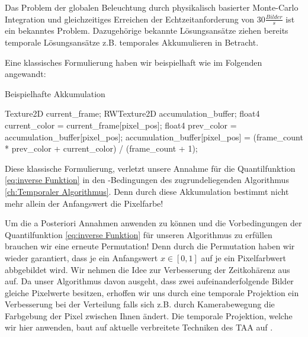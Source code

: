 Das Problem der globalen Beleuchtung durch physikalisch basierter Monte-Carlo Integration und gleichzeitiges Erreichen der 
Echtzeitanforderung von 30$\frac{Bilder}{s}$ ist ein bekanntes Problem. Dazugehörige bekannte Lösungsansätze 
ziehen bereits temporale Lösungsansätze z.B. temporales Akkumulieren \cite{schied2017spatiotemporal} in Betracht. 
\par 

Eine klassisches Formulierung \cite{UE4TAA} haben wir beispielhaft wie im Folgenden angewandt:

\begin{tcolorbox}
  \begin{algorithm}[H]
    \caption{Beispielhafte Akkumulation}
    \begin{algorithmic}[1]
        \State Texture2D current\_frame;
        \State RWTexture2D accumulation\_buffer;
        \State float4 current\_color = current\_frame[pixel\_pos];
        \State float4 prev\_color = accumulation\_buffer[pixel\_pos];
        \State accumulation\_buffer[pixel\_pos] = 
        \State (frame\_count * prev\_color + current\_color) / (frame\_count + 1);
    \end{algorithmic}
    \label{alg:TemporalAccumulation}
\end{algorithm}
\end{tcolorbox}

Diese klassische Formulierung, verletzt unsere Annahme für die Quantilfunktion \ref{eq:inverse Funktion}
in den -Bedingungen des zugrundeliegenden Algorithmus 
\ref{ch:Temporaler Algorithmus}. Denn durch diese Akkumulation bestimmt nicht mehr allein der 
Anfangswert die Pixelfarbe!
\par 

\begin{figure}[H]
    
    \label{subsec:Temporales Projezieren}
\end{figure}
Um die a Posteriori Annahmen anwenden zu können und die Vorbedingungen der Quantilfunktion \ref{eq:inverse Funktion}
für unseren Algorithmus zu erfüllen brauchen wir eine erneute Permutation! Denn durch die Permutation haben wir wieder garantiert, 
dass je ein Anfangswert $x \in [0,1]$ auf je ein Pixelfarbwert abbgebildet wird. Wir nehmen die Idee zur Verbesserung der Zeitkohärenz
aus \cite[S.9/10]{hal02158423} auf. Da unser Algorithmus davon ausgeht, dass zwei aufeinanderfolgende Bilder gleiche Pixelwerte 
besitzen, erhoffen wir uns durch eine temporale Projektion ein Verbesserung bei der  Verteilung 
falls sich z.B. durch Kamerabewegung die Farbgebung der Pixel zwischen Ihnen ändert. Die temporale Projektion, welche wir hier 
anwenden, baut auf aktuelle verbreitete Techniken des TAA auf \cite{INSIDETAA}.

